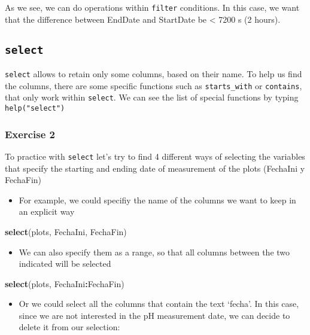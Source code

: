 \documentclass[]{article}
\newenvironment{Shaded}{\begin{snugshade}}{\end{snugshade}}
\newcommand{\KeywordTok}[1]{\textcolor[rgb]{0.13,0.29,0.53}{\textbf{#1}}}
\newcommand{\OperatorTok}[1]{\textcolor[rgb]{0.81,0.36,0.00}{\textbf{#1}}}
\newcommand{\NormalTok}[1]{#1}
\providecommand{\tightlist}{%
  \setlength{\itemsep}{0pt}\setlength{\parskip}{0pt}}
\begin{document}
As we see, we can do operations within \texttt{filter} conditions. In
this case, we want that the difference between EndDate and StartDate be
\textless{} 7200 s (2 hours).

\subsection{\texorpdfstring{\texttt{select}}{select}}\label{select}

\texttt{select} allows to retain only some columns, based on their name.
To help us find the columns, there are some specific functions such as
\texttt{starts\_with} or \texttt{contains}, that only work within
\texttt{select}. We can see the list of special functions by typing
\texttt{help("select")}

\subsubsection{Exercise 2}\label{exercise-2}

To practice with \texttt{select} let's try to find 4 different ways of
selecting the variables that specify the starting and ending date of
measurement of the plots (FechaIni y FechaFin)

\begin{itemize}
\tightlist
\item
  For example, we could specifiy the name of the columns we want to keep
  in an explicit way
\end{itemize}

\begin{Shaded}
\begin{Highlighting}[]
\KeywordTok{select}\NormalTok{(plots, FechaIni, FechaFin)}
\end{Highlighting}
\end{Shaded}

\begin{itemize}
\tightlist
\item
  We can also specify them as a range, so that all columns between the
  two indicated will be selected
\end{itemize}

\begin{Shaded}
\begin{Highlighting}[]
\KeywordTok{select}\NormalTok{(plots, FechaIni}\OperatorTok{:}\NormalTok{FechaFin)}
\end{Highlighting}
\end{Shaded}

\begin{itemize}
\tightlist
\item
  Or we could select all the columns that contain the text `fecha'. In
  this case, since we are not interested in the pH measurement date, we
  can decide to delete it from our selection:
\end{itemize}
\end{document}
